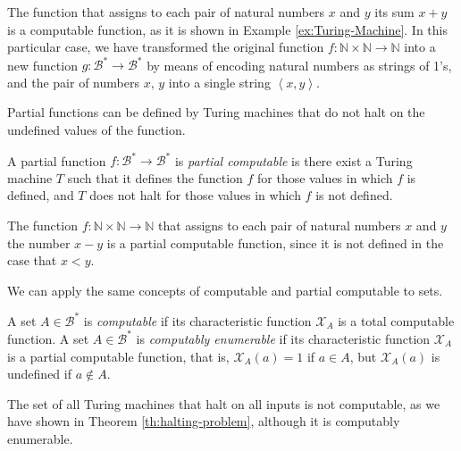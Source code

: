 \begin{example}
The function that assigns to each pair of natural numbers $x$ and $y$ its sum $x + y$ is a computable function, as it is shown in Example \ref{ex:Turing-Machine}. In this particular case, we have transformed the original function $f: \mathbb{N} \times \mathbb{N} \rightarrow \mathbb{N}$ into a new function $g:\mathcal{B}^{\ast}\rightarrow\mathcal{B}^{\ast}$ by means of encoding natural numbers as strings of 1's, and the pair of numbers $x$, $y$ into a single string $\left\langle x, y \right\rangle$.
\end{example}

Partial functions can be defined by Turing machines that do not halt on the undefined values of the function.

\begin{definition}
A partial function $f:\mathcal{B}^{\ast}\rightarrow\mathcal{B}^{\ast}$ is \emph{partial computable} is there exist a Turing machine $T$ such that it defines the function $f$ for those values in which $f$ is defined, and $T$ does not halt for those values in which $f$ is not defined.
\end{definition}

\begin{example}
The function $f: \mathbb{N} \times \mathbb{N} \rightarrow \mathbb{N}$ that assigns to each pair of natural numbers $x$ and $y$ the number $x - y$ is a partial computable function, since it is not defined in the case that $x < y$.
\end{example}

We can apply the same concepts of computable and partial computable to sets.

\begin{definition}
A set $A \in \mathcal{B}^\ast$ is \emph{computable} if its characteristic function $\mathcal{X}_A$ is a total computable function. A set $A \in \mathcal{B}^\ast$ is \emph{computably enumerable} if its characteristic function $\mathcal{X}_A$ is a partial computable function, that is, $\mathcal{X}_A(a) = 1$ if $a \in A$, but $\mathcal{X}_A(a)$ is undefined if $a \not\in A$.
\end{definition}

\begin{example}
The set of all Turing machines that halt on all inputs is not computable, as we have shown in Theorem \ref{th:halting-problem}, although it is computably enumerable.
\end{example}

%
%

